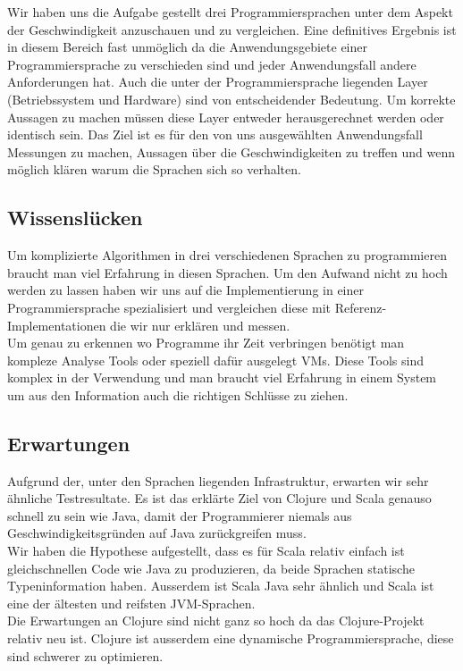 \documentclass{fancydocument}
\begin{document}
Wir haben uns die Aufgabe gestellt drei Programmiersprachen unter dem
Aspekt der Geschwindigkeit anzuschauen und zu vergleichen. Eine
definitives Ergebnis ist in diesem Bereich fast unmöglich da die
Anwendungsgebiete einer Programmiersprache zu verschieden sind und
jeder Anwendungsfall andere Anforderungen hat. Auch die
unter der Programmiersprache liegenden Layer (Betriebssystem und
Hardware) sind von entscheidender Bedeutung. Um korrekte Aussagen zu
machen m\"ussen diese Layer entweder herausgerechnet werden oder
identisch sein. Das Ziel ist es f\"ur den von uns ausgew\"ahlten Anwendungsfall Messungen
zu machen, Aussagen \"uber die Geschwindigkeiten zu treffen und
wenn m\"oglich kl\"aren warum die Sprachen sich so verhalten.

\subsection{Wissenslücken}

Um komplizierte Algorithmen in drei verschiedenen Sprachen zu
programmieren braucht man viel Erfahrung in diesen Sprachen. Um den
Aufwand nicht zu hoch werden zu lassen haben wir uns auf die
Implementierung in einer Programmiersprache spezialisiert und
vergleichen diese mit Referenz-Implementationen die wir nur erklären
und messen.
\\
Um genau zu erkennen wo Programme ihr Zeit verbringen benötigt man
kompleze Analyse Tools oder speziell dafür ausgelegt VMs. Diese Tools
sind komplex in der Verwendung und man braucht viel Erfahrung in einem
System um aus den Information auch die richtigen Schlüsse zu ziehen.

\subsection{Erwartungen}

Aufgrund der, unter den Sprachen liegenden Infrastruktur, erwarten wir sehr
\"ahnliche Testresultate. Es ist das erkl\"arte Ziel von Clojure und
Scala genauso schnell zu sein wie Java, damit der Programmierer niemals aus Geschwindigkeitsgründen auf Java zurückgreifen muss.
\\
Wir haben die Hypothese aufgestellt, dass es für Scala relativ einfach ist
gleichschnellen Code wie Java zu produzieren, da beide Sprachen 
statische Typeninformation haben. Ausserdem ist Scala Java sehr ähnlich
und Scala ist eine der \"altesten und reifsten JVM-Sprachen.
\\
Die Erwartungen an Clojure sind nicht ganz so hoch da das Clojure-Projekt relativ neu ist. Clojure 
ist ausserdem eine dynamische Programmiersprache, diese sind schwerer zu optimieren.
\end{document}
